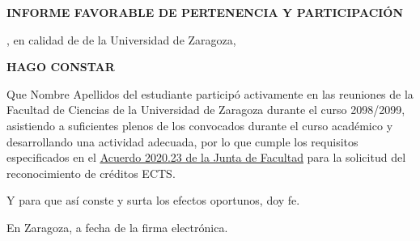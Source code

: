 \documentclass[11pt,a4paper]{article}
\newcommand{\nombre}{Nombre Apellidos del estudiante}
\newcommand{\curso}{2098/2099}
\newcommand{\urlacuerdo}{https://ciencias.unizar.es/sites/ciencias/files/users/fmlou/pdf/acuerdosjuntafacultad/2020_23_criterios_reconoc_creditos_activ_repres_report.pdf}
\begin{document}
\begin{center}
{\Large\bfseries INFORME FAVORABLE DE PERTENENCIA Y PARTICIPACIÓN}
\end{center}

\firmante, en calidad de \cargofirmante{} de la Universidad de Zaragoza,

\begin{center}{\bfseries HAGO CONSTAR}\end{center}

Que \nombre{} participó activamente en las reuniones \delorgano{} de la
Facultad de Ciencias de la Universidad de Zaragoza durante el curso \curso,
asistiendo a suficientes plenos de los convocados durante el curso académico y
desarrollando una actividad adecuada, por lo que cumple los requisitos
especificados en el
\href{\urlacuerdo}{\textcolor{enlace}{\underline{Acuerdo 2020.23 de la Junta de Facultad}}}
para la solicitud del reconocimiento de créditos ECTS.

Y para que así conste y surta los efectos oportunos, doy fe.

En Zaragoza, a fecha de la firma electrónica.
\firma
\end{document}
